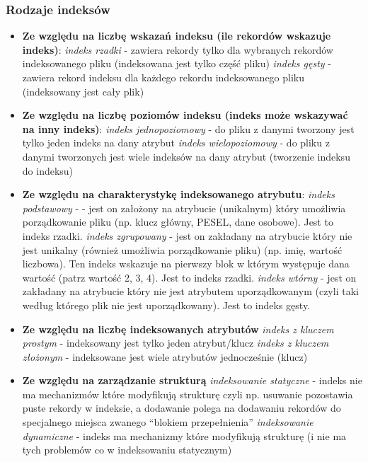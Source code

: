 \documentclass[a4paper,12pt,oneside]{book}
\begin{document}
				\subsubsection{Rodzaje indeksów}
				\begin{itemize}
					\item \textbf{Ze względu na liczbę wskazań indeksu (ile rekordów wskazuje indeks)}:
						\subitem \textit{indeks rzadki} - zawiera rekordy tylko dla wybranych rekordów indeksowanego pliku (indeksowana jest tylko część pliku)
						\subitem \textit{indeks gęsty} - zawiera rekord indeksu dla każdego rekordu indeksowanego pliku (indeksowany jest cały plik)
					\item \textbf{Ze względu na liczbę poziomów indeksu (indeks może wskazywać na inny indeks)}:
						\subitem \textit{indeks jednopoziomowy} - do pliku z danymi tworzony jest tylko jeden indeks na dany atrybut
						\subitem \textit{indeks wielopoziomowy} - do pliku z danymi tworzonych jest wiele indeksów na dany atrybut (tworzenie indeksu do indeksu)
					\item \textbf{Ze względu na charakterystykę indeksowanego atrybutu}:
						\subitem \textit{indeks podstawowy} - - jest on założony na atrybucie (unikalnym) który umożliwia porządkowanie pliku (np. klucz główny, PESEL, dane osobowe). Jest to indeks rzadki.
						\subitem \textit{indeks zgrupowany} - jest on zakładany na atrybucie który nie jest unikalny (również umożliwia porządkowanie pliku) (np. imię, wartość liczbowa). Ten indeks wskazuje na pierwszy blok w którym występuje dana wartość (patrz wartość 2, 3, 4). Jest to indeks rzadki.
						\subitem \textit{indeks wtórny} - jest on zakładany na atrybucie który nie jest atrybutem uporządkowanym (czyli taki według którego plik nie jest uporządkowany). Jest to indeks gęsty.
					\item \textbf{Ze względu na liczbę indeksowanych atrybutów}
						\subitem \textit{indeks z kluczem prostym} - indeksowany jest tylko jeden atrybut/klucz
						\subitem \textit{indeks z kluczem złożonym} - indeksowane jest wiele atrybutów jednocześnie (klucz)
					\item \textbf{Ze względu na zarządzanie strukturą}
						\subitem \textit{indeksowanie statyczne} - indeks nie ma mechanizmów które modyfikują strukturę czyli np. usuwanie pozostawia puste rekordy w indeksie, a dodawanie polega na dodawaniu rekordów do specjalnego miejsca zwanego “blokiem przepełnienia”
						\subitem \textit{indeksowanie dynamiczne} - indeks ma mechanizmy które modyfikują strukturę (i nie ma tych problemów co w indeksowaniu statycznym)
				\end{itemize}
\end{document}
